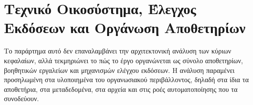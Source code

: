 \chapter{Τεχνικό Οικοσύστημα, Έλεγχος Εκδόσεων και Οργάνωση Αποθετηρίων}
\label{app:engineering_ecosystem}

Το παράρτημα αυτό δεν επαναλαμβάνει την αρχιτεκτονική ανάλυση των κύριων κεφαλαίων,
αλλά τεκμηριώνει το πώς το έργο οργανώνεται ως σύνολο αποθετηρίων, βοηθητικών εργαλείων και μηχανισμών ελέγχου εκδόσεων.
Η ανάλυση παραμένει προσηλωμένη στα υλοποιημένα  του οργανωσιακού περιβάλλοντος, δηλαδή στα ίδια τα αποθετήρια,
στα  μεταδεδομένα, στα  αρχεία και στις ροές αυτοματοποίησης που τα συνοδεύουν.



